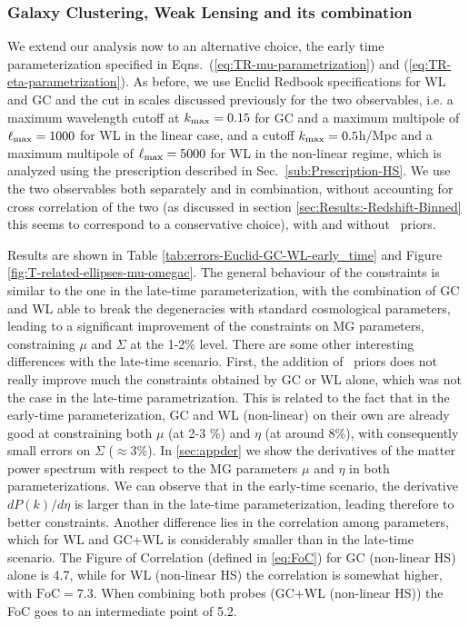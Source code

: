 \subsubsection{Galaxy Clustering, Weak Lensing and its combination}

We extend our analysis now to an alternative choice, the early time parameterization specified in Eqns.\ (\ref{eq:TR-mu-parametrization}) and (\ref{eq:TR-eta-parametrization}). As before, we use
Euclid Redbook specifications for WL and GC
and the cut in scales discussed previously for the two observables, i.e. 
a maximum wavelength cutoff at $k_{\rm max}=0.15$ for GC and a maximum multipole of $\ell_{\rm max}=1000$ for WL in the 
linear case, and a cutoff $k_{\rm max}=0.5$h/Mpc and a maximum multipole of $\ell_{\rm max}=5000$ for WL in the non-linear regime,
which is analyzed using the prescription described in Sec.\ \ref{sub:Prescription-HS}.
We use the two observables both separately and in combination, without accounting for cross correlation of the two (as discussed in section \ref{sec:Results:-Redshift-Binned} this seems to correspond to a conservative choice), 
with and without \planck\ priors.

Results are shown in Table \ref{tab:errors-Euclid-GC-WL-early_time} and 
Figure \ref{fig:T-related-ellipses-mu-omegac}.
The general behaviour of the constraints is similar to the one in the late-time parameterization,
with the combination of GC and WL able to break the degeneracies with standard cosmological
parameters, leading to a significant improvement of the constraints on MG parameters, constraining $\mu$ and $\Sigma$ at the 1-2\% level. 
There are some other interesting differences with the late-time scenario. 
First, the addition of \planck\ priors does not really improve much the constraints obtained by GC or WL alone, which was not the case in the 
late-time parametrization. This is related to the fact that in the early-time parameterization, GC and WL (non-linear) on their own are already good at constraining both
$\mu$ (at 2-3 \%) and $\eta$ (at around 8\%), with consequently small errors on $\Sigma$ ($\approx 3$\%).
In \cref{sec:appder} we show the derivatives of the matter power spectrum with respect to the MG parameters $\mu$ and $\eta$ in both
parameterizations. We can observe that in the early-time scenario, the derivative  $dP(k)/d\eta$ is larger than in the late-time
parameterization, leading therefore to better constraints.
Another difference lies in the correlation among parameters, which for WL and GC+WL is considerably smaller than in the late-time scenario. 
The Figure of Correlation (defined in \cref{eq:FoC}) for GC (non-linear HS) alone is 4.7, while
for WL (non-linear HS) the correlation is somewhat higher, with $\textrm{FoC}=7.3$.
When combining both probes (GC+WL (non-linear HS)) the FoC goes to an intermediate point of 5.2.

